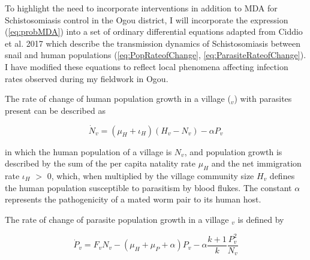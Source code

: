 \documentclass[12pt]{article}
\begin{document}
 
To highlight the need to incorporate interventions in addition to MDA for Schistosomiasis control in the Ogou district, I will incorporate the expression (\ref{eq:probMDA}) into a set of ordinary differential equations adapted from Ciddio et al. 2017 which describe the transmission dynamics of Schistosomiasis between snail and human populations (\ref{eq:PopRateofChange}, \ref{eq:ParasiteRateofChange}). I have modified these equations to reflect local phenomena affecting infection rates observed during my fieldwork in Ogou. 


The rate of change of human population growth in a village ($_v$) with parasites present can be described as 

\begin{equation}\label{eq:PopRateofChange}
\dot{N}_v = (\mu_H+\iota_H)(H_v - N_v) - \alpha P_v
\end{equation}

 in which the human population of a village is $N_v$, and population growth is described by the sum of the per capita natality rate $\mu_H$ and the net immigration rate $\iota_H$ $>$ 0, which, when multiplied by the village community size $H_v$ defines the human population susceptible to parasitism by blood flukes. The constant $\alpha$ represents the pathogenicity of a mated worm pair to its human host. 
 
 The rate of change of parasite population growth in a village $_v$ is defined by
 
 \begin{equation}\label{eq:ParasiteRateofChange}
 \dot{P}_v = F_vN_v - (\mu_H + \mu_P + \alpha)P_v - \alpha \frac{k +1 }{k}\frac{P_v^2}{N_v}
 \end{equation}
\end{document}
